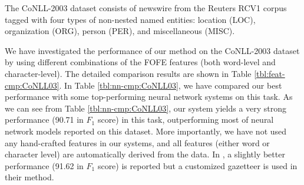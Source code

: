 \documentclass[11pt,a4paper]{article}
\newcommand{\cmark}{\ding{51}}
\newcommand{\xmark}{\ding{55}}
\begin{document}
The CoNLL-2003 dataset \cite{tjong2003introduction} consists of newswire from the Reuters RCV1 corpus tagged with four types of non-nested named entities: location (LOC), organization (ORG), person (PER), and miscellaneous (MISC).

We have investigated the performance of our method on the CoNLL-2003 dataset by using different combinations of the FOFE features (both word-level and character-level). The detailed comparison results are shown in Table \ref{tbl:feat-cmp:CoNLL03}.  In Table \ref{tbl:nn-cmp:CoNLL03}, we have compared our best performance with some top-performing neural network systems on this task. As we can see from Table \ref{tbl:nn-cmp:CoNLL03}, our system yields a very strong performance (90.71 in $F_1$ score) in this task, outperforming most of neural network models reported on this dataset. More importantly, we have not used any hand-crafted features in our systems, and all features (either word or character level) are automatically derived from the data. 
In \cite{chiu2016named}, a slightly better performance (91.62 in $F_1$ score) is reported but a customized gazetteer is used in their method.


\end{document}
